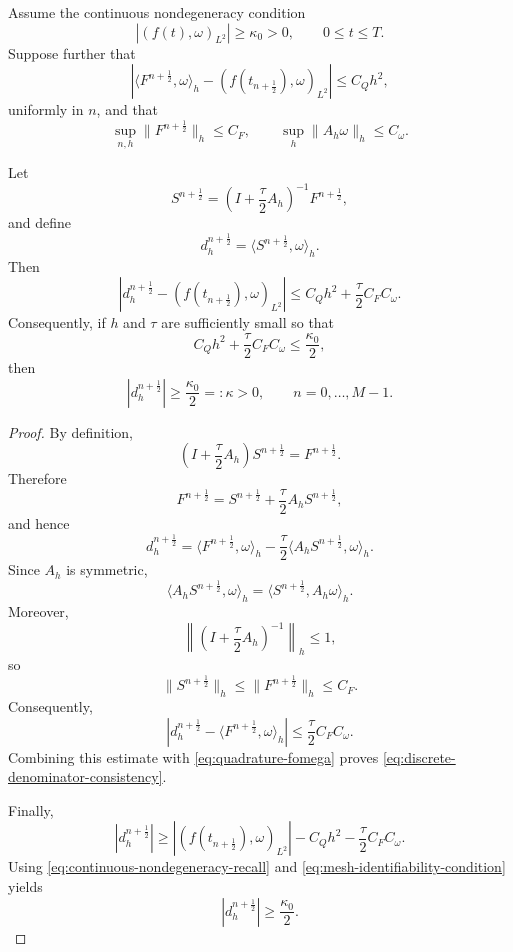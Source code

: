 \documentclass[reqno]{amsart}
\begin{document}
\begin{lemma}
\label{lem:discrete-identifiability}
Assume the continuous nondegeneracy condition
\begin{equation}
|(f(t),\omega)_{L^2}|
\ge
\kappa_0>0,
\qquad
0\le t\le T.
\label{eq:continuous-nondegeneracy-recall}
\end{equation}
Suppose further that
\begin{equation}
\left|
\langle F^{n+\frac12},\omega\rangle_h
-
(f(t_{n+\frac12}),\omega)_{L^2}
\right|
\le
C_Qh^2,
\label{eq:quadrature-fomega}
\end{equation}
uniformly in \(n\), and that
\begin{equation}
\sup_{n,h}\|F^{n+\frac12}\|_h\le C_F,
\qquad
\sup_h\|A_h\omega\|_h\le C_\omega.
\label{eq:identifiability-bounds}
\end{equation}

Let
\[
S^{n+\frac12}
=
\left(I+\frac{\tau}{2}A_h\right)^{-1}
F^{n+\frac12},
\]
and define
\[
d_h^{n+\frac12}
=
\langle S^{n+\frac12},\omega\rangle_h.
\]
Then
\begin{equation}
\left|
d_h^{n+\frac12}
-
(f(t_{n+\frac12}),\omega)_{L^2}
\right|
\le
C_Qh^2
+
\frac{\tau}{2}C_FC_\omega.
\label{eq:discrete-denominator-consistency}
\end{equation}
Consequently, if \(h\) and \(\tau\) are sufficiently small so that
\begin{equation}
C_Qh^2
+
\frac{\tau}{2}C_FC_\omega
\le
\frac{\kappa_0}{2},
\label{eq:mesh-identifiability-condition}
\end{equation}
then
\begin{equation}
|d_h^{n+\frac12}|
\ge
\frac{\kappa_0}{2}
=:\kappa
>0,
\qquad
n=0,\ldots,M-1.
\label{eq:discrete-identifiability}
\end{equation}
\end{lemma}

\begin{proof}
By definition,
\[
\left(I+\frac{\tau}{2}A_h\right)
S^{n+\frac12}
=
F^{n+\frac12}.
\]
Therefore
\[
F^{n+\frac12}
=
S^{n+\frac12}
+
\frac{\tau}{2}A_hS^{n+\frac12},
\]
and hence
\[
d_h^{n+\frac12}
=
\langle F^{n+\frac12},\omega\rangle_h
-
\frac{\tau}{2}
\langle A_hS^{n+\frac12},\omega\rangle_h.
\]
Since \(A_h\) is symmetric,
\[
\langle A_hS^{n+\frac12},\omega\rangle_h
=
\langle S^{n+\frac12},A_h\omega\rangle_h.
\]
Moreover,
\[
\left\|
\left(I+\frac{\tau}{2}A_h\right)^{-1}
\right\|_h
\le1,
\]
so
\[
\|S^{n+\frac12}\|_h
\le
\|F^{n+\frac12}\|_h
\le C_F.
\]
Consequently,
\[
\left|
d_h^{n+\frac12}
-
\langle F^{n+\frac12},\omega\rangle_h
\right|
\le
\frac{\tau}{2}C_FC_\omega.
\]
Combining this estimate with
\eqref{eq:quadrature-fomega} proves
\eqref{eq:discrete-denominator-consistency}.

Finally,
\[
|d_h^{n+\frac12}|
\ge
|(f(t_{n+\frac12}),\omega)_{L^2}|
-
C_Qh^2
-
\frac{\tau}{2}C_FC_\omega.
\]
Using \eqref{eq:continuous-nondegeneracy-recall} and
\eqref{eq:mesh-identifiability-condition} yields
\[
|d_h^{n+\frac12}|
\ge
\frac{\kappa_0}{2}.
\]
\end{proof}
\end{document}
